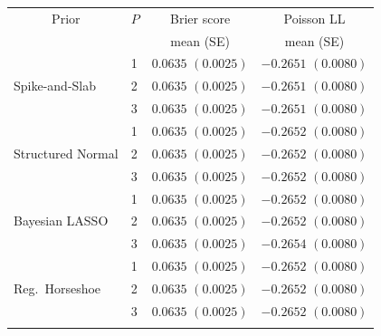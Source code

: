 \begin{tabular}{llcc}
\toprule
\multicolumn{1}{c}{Prior} & 
\multicolumn{1}{c}{$P$} & 
Brier score & 
Poisson LL \\
& & mean (SE) & mean (SE) \\
\midrule
\multirow{3}{*}{Spike-and-Slab}
  & 1 & $0.0635$ $(0.0025)$ & $-0.2651$ $(0.0080)$ \\
  & 2 & $0.0635$ $(0.0025)$ & $-0.2651$ $(0.0080)$ \\
  & 3 & $0.0635$ $(0.0025)$ & $-0.2651$ $(0.0080)$ \\
\midrule
\multirow{3}{*}{Structured Normal}
  & 1 & $0.0635$ $(0.0025)$ & $-0.2652$ $(0.0080)$ \\
  & 2 & $0.0635$ $(0.0025)$ & $-0.2652$ $(0.0080)$ \\
  & 3 & $0.0635$ $(0.0025)$ & $-0.2652$ $(0.0080)$ \\
\midrule
\multirow{3}{*}{Bayesian LASSO}
  & 1 & $0.0635$ $(0.0025)$ & $-0.2652$ $(0.0080)$ \\
  & 2 & $0.0635$ $(0.0025)$ & $-0.2652$ $(0.0080)$ \\
  & 3 & $0.0635$ $(0.0025)$ & $-0.2654$ $(0.0080)$ \\
\midrule
\multirow{3}{*}{Reg.\ Horseshoe}
  & 1 & $0.0635$ $(0.0025)$ & $-0.2652$ $(0.0080)$ \\
  & 2 & $0.0635$ $(0.0025)$ & $-0.2652$ $(0.0080)$ \\
  & 3 & $0.0635$ $(0.0025)$ & $-0.2652$ $(0.0080)$ \\
\bottomrule
\multicolumn{4}{l}{}
\end{tabular}
